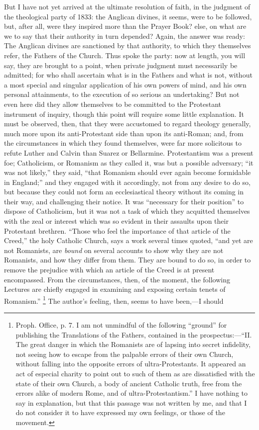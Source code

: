But I have not yet arrived at the ultimate resolution of faith, in
the judgment of the theological party of 1833: the Anglican divines,
it seems, were to be followed, but, after all, were they inspired more
than the Prayer Book? else, on what are we to say that their authority
in turn depended? Again, the answer was ready: The Anglican divines
are sanctioned by that authority, to which they themselves refer, the
Fathers of the Church. Thus spoke the party: now at length, you will
say, they are brought to a point, when private judgment must
necessarily be admitted; for who shall ascertain what is in the
Fathers and what is not, without a most special and singular
application of his own powers of mind, and his own personal
attainments, to the execution of so serious an undertaking? But not
even here did they allow themselves to be committed to the Protestant
instrument of inquiry, though this point will require some little
explanation. It must be observed, then, that they were accustomed to
regard theology generally, much more upon its anti-Protestant side
than upon its anti-Roman; and, from the circumstances in which they
found themselves, were far more solicitous to refute Luther and Calvin
than Suarez or Bellarmine. Protestantism was a present foe;
Catholicism, or Romanism as they called it, was but a possible
adversary; ``it was not likely,'' they said, ``that Romanism should ever again become formidable in England;'' and
they engaged with it accordingly, not from any desire to do so, but
because they could not form an ecclesiastical theory without its
coming in their way, and challenging their notice. It was
``necessary for their position'' to dispose of Catholicism,
but it was not a task of which they acquitted themselves with the zeal
or interest which was so evident in their assaults upon their
Protestant brethren. ``Those who feel the importance of that
article of the Creed,'' the holy Catholic Church, says a work
several times quoted, ``and yet are not Romanists, are \emph{bound}
on several accounts to show why they are not Romanists, and how they
differ from them. They are bound to do so, in order to remove the
prejudice with which an article of the Creed is at present
encompassed. From the circumstances, then, of the moment, the
following Lectures are chiefly engaged in examining and exposing
certain tenets of Romanism.'' \footnote{Proph. Office, p. 7. I am not unmindful of
the following ``ground'' for publishing the Translations of
the Fathers, contained in the prospectus:—``II. The great danger
in which the Romanists are of lapsing into secret infidelity, not
seeing how to escape from the palpable errors of their own Church,
without falling into the opposite errors of ultra-Protestants. It
appeared an act of especial charity to point out to such of them as
are dissatisfied with the state of their own Church, a body of ancient
Catholic truth, free from the errors alike of modern Rome, and of
ultra-Protestantism.'' I have nothing to say in explanation, but
that this passage was not written by me, and that I do not consider it
to have expressed my own feelings, or those of the movement.} The author's feeling, then, seems to have been,—I should
